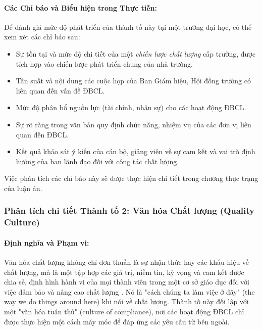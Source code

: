 \documentclass[12pt, a4paper, openany]{report}
\begin{document}
\paragraph{Các Chỉ báo và Biểu hiện trong Thực tiễn:}
Để đánh giá mức độ phát triển của thành tố này tại một trường đại học, có thể xem xét các chỉ báo sau:
\begin{itemize}
    \item Sự tồn tại và mức độ chi tiết của một \textit{chiến lược chất lượng} cấp trường, được tích hợp vào chiến lược phát triển chung của nhà trường.
    \item Tần suất và nội dung các cuộc họp của Ban Giám hiệu, Hội đồng trường có liên quan đến vấn đề ĐBCL.
    \item Mức độ phân bổ nguồn lực (tài chính, nhân sự) cho các hoạt động ĐBCL.
    \item Sự rõ ràng trong văn bản quy định chức năng, nhiệm vụ của các đơn vị liên quan đến ĐBCL.
    \item Kết quả khảo sát ý kiến của cán bộ, giảng viên về sự cam kết và vai trò định hướng của ban lãnh đạo đối với công tác chất lượng.
\end{itemize}
Việc phân tích các chỉ báo này sẽ được thực hiện chi tiết trong chương thực trạng của luận án.


\subsubsection{Phân tích chi tiết Thành tố 2: Văn hóa Chất lượng (Quality Culture)}
\label{subsubsec:thanh_to_2}

\paragraph{Định nghĩa và Phạm vi:}
Văn hóa chất lượng không chỉ đơn thuần là sự nhận thức hay các khẩu hiệu về chất lượng, mà là một tập hợp các giá trị, niềm tin, kỳ vọng và cam kết được chia sẻ, định hình hành vi của mọi thành viên trong một cơ sở giáo dục đối với việc đảm bảo và nâng cao chất lượng \cite{HarveyStensaker}. Nó là "cách chúng ta làm việc ở đây" (the way we do things around here) khi nói về chất lượng. Thành tố này đối lập với một "văn hóa tuân thủ" (culture of compliance), nơi các hoạt động ĐBCL chỉ được thực hiện một cách máy móc để đáp ứng các yêu cầu từ bên ngoài.
\end{document}
